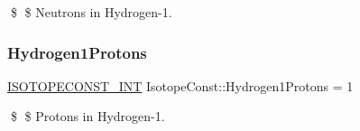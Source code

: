 \$ \$ Neutrons in Hydrogen-\/1. \mbox{\label{group___isotope_const-_hydrogen-_h1_ga3190f479a347bbc7a36db8cb989380ab}} 
\subsubsection{\texorpdfstring{Hydrogen1\+Protons}{Hydrogen1Protons}}
{\footnotesize\ttfamily \mbox{\hyperlink{group___isotope_const-_macros_ga5f18360b3e99483a35c32d789e62621c}{I\+S\+O\+T\+O\+P\+E\+C\+O\+N\+S\+T\+\_\+\+I\+NT}} Isotope\+Const\+::\+Hydrogen1\+Protons = 1}

\$ \$ Protons in Hydrogen-\/1. 